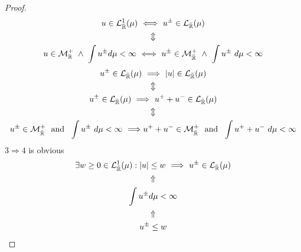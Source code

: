 \begin{proof}
\begin{gather*}
u\in \mathcal{L}_{\bar{\Bbb{R}}}^1(\mu )\  \Longleftrightarrow \  u^\pm \in \mathcal{L}_{\bar{\Bbb{R}}}(\mu ) \\
\Updownarrow \\
u\in \mathcal{M}_{\Bbb{R}}^+\  \wedge \  \int   u ^\pm d\mu <\infty \  \Longleftrightarrow \  u^\pm \in \mathcal{M}_{\bar{\Bbb{R}}}^+\   \wedge \  \int   u ^\pm \  d\mu <\infty 
\end{gather*}
\begin{gather*}
u^\pm \in \mathcal{L}_{\bar{\Bbb{R}}}(\mu )\  \Longrightarrow \  |u|\in \mathcal{L}_{\bar{\Bbb{R}}}(\mu )\\
\Updownarrow  \\
u^\pm \in \mathcal{L}_{\bar{\Bbb{R}}}(\mu )\  \Longrightarrow \  u^+ + u^- \in \mathcal{L}_{\bar{\Bbb{R}}}(\mu )\\
\Updownarrow  \\
u^\pm \in \mathcal{M}_{\bar{\Bbb{R}}}^+\   \text{ and }\  \int u^\pm \  d\mu <\infty \  \Longrightarrow u^+ + u^-\in \mathcal{M}_{\bar{\Bbb{R}}}^+\   \text{ and }\  \int u^+ + u^-\  d\mu <\infty 
\end{gather*}
\(3\Rightarrow 4\) is obvious
\begin{gather*}
\exists w\geq 0\in \mathcal{L}_{\bar{\Bbb{R}}}^1(\mu ):|u|\leq w\  \Longrightarrow \  u^\pm \in \mathcal{L}_{\bar{\Bbb{R}}}(\mu ) \\
\Uparrow  \\
\int u^{\pm } d\mu <\infty  \\
\Uparrow  \\
u^\pm \leq w
\end{gather*}
\end{proof}

